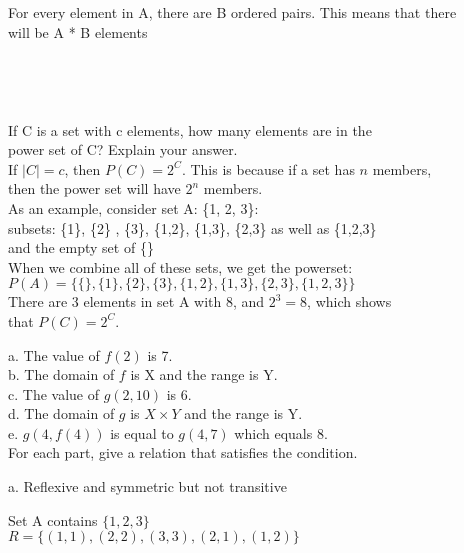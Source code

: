 \documentclass[12pt]{article}
\begin{document}
\indent
For every element in A, there are B ordered pairs. This means that there \\
\indent
will be A * B elements \\ \\
\\ \\ \\
 \quad If C is a set with c elements, how many elements are in the \\
\indent \quad power set of C? Explain your answer. \\

\indent
If $|C| = c$, then $P(C) = 2^{C}$. This is because if a set has $n$ members, \\
\indent then the power set will have $2^{n}$ members. \\

As an example, consider set A: \{1, 2, 3\}: \\

subsets: \{1\}, \{2\} , \{3\}, \{1,2\}, \{1,3\}, \{2,3\} as well as \{1,2,3\} \\
\indent and the empty set of \{\} \\

When we combine all of these sets, we get the powerset: \\
\indent $P(A) = \{\{\},  \{1\}, \{2\}, \{3\}, \{1,2\}, \{1,3\}, \{2,3\}, \{1,2,3\}  \}$ \\

There are 3 elements in set A with 8, and $2^{3} = 8$, which shows \\
\indent that $P(C) = 2^{C}$. \\


a. The value of $f(2)$ is 7. \\
\indent b. The domain of $f$ is X and the range is Y. \\
\indent c. The value of $g(2,10)$ is 6. \\
\indent d. The domain of $g$ is $X \times Y$ and the range is Y. \\
\indent e. $g(4, f(4))$ is equal to $g(4, 7)$ which equals 8. \\

 \quad For each part, give a relation that satisfies the condition.

a. Reflexive and symmetric but not transitive

\quad Set A contains $\{1, 2, 3\}$ \\
\indent \quad $R = \{(1,1), (2,2), (3,3), (2,1), (1, 2) \}$ \\
\end{document}
